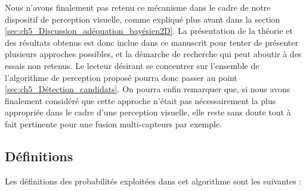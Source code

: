 Nous n'avons finalement pas retenu ce mécanisme dans le cadre de notre dispositif de perception visuelle, comme expliqué plus avant dans la section \ref{sec:ch5_Discussion_adéquation_bayésien2D}. La présentation de la théorie et des résultats obtenus est donc inclue dans ce manuscrit pour tenter de présenter plusieurs approches possibles, et la démarche de recherche qui peut aboutir à des essais non retenus. Le lecteur désirant se concentrer sur l'ensemble de l'algorithme de perception proposé pourra donc passer au point \ref{sec:ch5_Détection_candidats}. On pourra enfin remarquer que, si nous avons finalement considéré que cette approche n'était pas nécessairement la plus appropriée dans le cadre d'une perception visuelle, elle reste sans doute tout à fait pertinente pour une fusion multi-capteurs par exemple.

\subsection{Définitions}
Les définitions des probabilités exploitées dans cet algorithme sont les suivantes : \\
